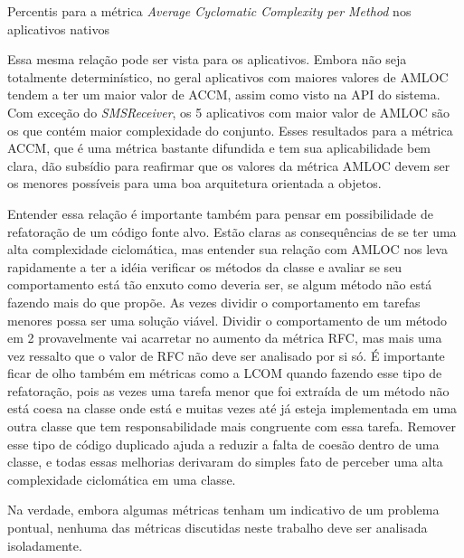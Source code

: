 \begin{table}[!htb]

\caption{Percentis para a métrica \textit{Average Cyclomatic Complexity per Method} nos aplicativos nativos}
\label{tab:accm_apps}
\end{table}


Essa mesma relação pode ser vista para os aplicativos. Embora não seja totalmente determinístico, no geral aplicativos com maiores valores de AMLOC tendem a ter um maior valor de ACCM, assim como visto na API do sistema. Com exceção do \textit{SMSReceiver}, os 5 aplicativos com maior valor de AMLOC são os que contém maior complexidade do conjunto. Esses resultados para a métrica ACCM, que é uma métrica bastante difundida e tem sua aplicabilidade bem clara, dão subsídio para reafirmar que os valores da métrica AMLOC devem ser os menores possíveis para uma boa arquitetura orientada a objetos.

Entender essa relação é importante também para pensar em possibilidade de refatoração de um código fonte alvo. Estão claras as consequências de se ter uma alta complexidade ciclomática, mas entender sua relação com AMLOC nos leva rapidamente a ter a idéia verificar os métodos da classe e avaliar se seu comportamento está tão enxuto como deveria ser, se algum método não está fazendo mais do que propõe. As vezes dividir o comportamento em tarefas menores possa ser uma solução viável. Dividir o comportamento de um método em 2 provavelmente vai acarretar no aumento da métrica RFC, mas mais uma vez ressalto que o valor de RFC não deve ser analisado por si só. É importante ficar de olho também em métricas como a LCOM quando fazendo esse tipo de refatoração, pois as vezes uma tarefa menor que foi extraída de um método não está coesa na classe onde está e muitas vezes até já esteja implementada em uma outra classe que tem responsabilidade mais congruente com essa tarefa. Remover esse tipo de código duplicado ajuda a reduzir a falta de coesão dentro de uma classe, e todas essas melhorias derivaram do simples fato de perceber uma alta complexidade ciclomática em uma classe.

Na verdade, embora algumas métricas tenham um indicativo de um problema pontual, nenhuma das métricas discutidas neste trabalho deve ser analisada isoladamente.

